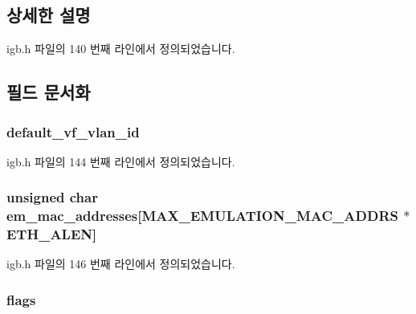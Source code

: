 \subsection{상세한 설명}


igb.\+h 파일의 140 번째 라인에서 정의되었습니다.



\subsection{필드 문서화}
\subsubsection[{\texorpdfstring{default\+\_\+vf\+\_\+vlan\+\_\+id}{default_vf_vlan_id}}]{ default\+\_\+vf\+\_\+vlan\+\_\+id}\hypertarget{structvf__data__storage_a3ffe091a80e7d63d253ce588d78352db}{}\label{structvf__data__storage_a3ffe091a80e7d63d253ce588d78352db}


igb.\+h 파일의 144 번째 라인에서 정의되었습니다.

\subsubsection[{\texorpdfstring{em\+\_\+mac\+\_\+addresses}{em_mac_addresses}}]{\setlength{\rightskip}{0pt plus 5cm}unsigned char em\+\_\+mac\+\_\+addresses\mbox{[}{\bf M\+A\+X\+\_\+\+E\+M\+U\+L\+A\+T\+I\+O\+N\+\_\+\+M\+A\+C\+\_\+\+A\+D\+D\+RS} $\ast${\bf E\+T\+H\+\_\+\+A\+L\+EN}\mbox{]}}\hypertarget{structvf__data__storage_a3f40032bc94d99aa94137769c46abfed}{}\label{structvf__data__storage_a3f40032bc94d99aa94137769c46abfed}


igb.\+h 파일의 146 번째 라인에서 정의되었습니다.

\subsubsection[{\texorpdfstring{flags}{flags}}]{ flags}\hypertarget{structvf__data__storage_a9fb2abd9f2594cefc48d6856e01f2879}{}\label{structvf__data__storage_a9fb2abd9f2594cefc48d6856e01f2879}


